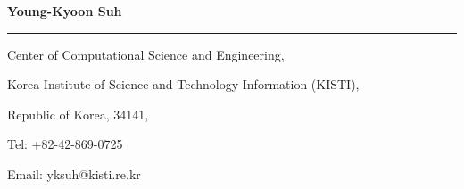 \documentclass{letter} %
\begin{document}
\signature{Young-Kyoon Suh}           %
\longindentation=0pt                       %
\let\raggedleft\raggedright                %
 
\begin{letter}{
%
}

\begin{flushleft}
{\large\bf Young-Kyoon Suh}
\end{flushleft}
\medskip\hrule height 1pt
\begin{flushright}
\hfill Center of Computational Science and Engineering, 
\end{flushright}
\vspace{-.15in}
\begin{flushright}
\hfill Korea Institute of Science and Technology Information (KISTI), 
\end{flushright}
\vspace{-.15in}
\begin{flushright}
\hfill Republic of Korea, 34141, 
\end{flushright}
\vspace{-.15in}
\begin{flushright}
\hfill Tel: +82-42-869-0725
\end{flushright}
\vspace{-.15in}
\begin{flushright}
\hfill Email: yksuh@kisti.re.kr
\end{flushright} 


\end{letter}
\end{document}
